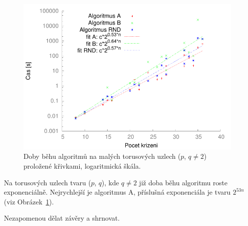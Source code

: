 \begin{figure}[p]\centering
\includegraphics{../img/torusNe2FIT}
\caption{Doby běhu algoritmů na malých torusových uzlech ($p$, $q\neq 2$) proložené křivkami, logaritmická škála.}
\label{obr03:torusFIT}
\end{figure}

Na torusových uzlech tvaru ($p$, $q$), kde $q\neq 2$ již doba běhu algoritmu roste exponenciálně. Nejrychlejší je algoritmus A, příslušná  exponenciála je tvaru $2^{53n}$ (viz Obrázek~\ref{obr03:torusFIT}).

Nezapomenou dělat závěry a shrnovat.

